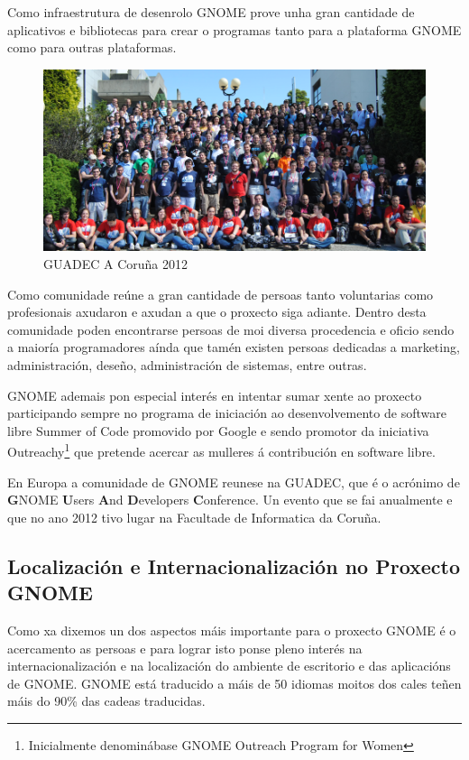 Como infraestrutura de desenrolo GNOME prove unha gran cantidade de aplicativos e bibliotecas para crear o programas tanto para a plataforma GNOME como para outras plataformas.

\begin{figure}[h!]
    \centering
    \includegraphics[width=\textwidth]{img/guadec_2012.png}
    \caption{GUADEC A Coruña 2012}
    \label{fig:guadec2012}
\end{figure}

Como comunidade reúne a gran cantidade de persoas tanto voluntarias como profesionais axudaron e axudan a que o proxecto siga adiante. Dentro desta comunidade poden encontrarse persoas de moi diversa procedencia e oficio sendo a maioría programadores aínda que tamén existen persoas dedicadas a marketing, administración, deseño, administración de sistemas, entre outras.

GNOME ademais pon especial interés en intentar sumar xente ao proxecto participando sempre no programa de iniciación ao desenvolvemento de software libre Summer of Code promovido por Google e sendo promotor da iniciativa Outreachy\footnote{Inicialmente denominábase GNOME Outreach Program for Women} que pretende acercar as mulleres á contribución en software libre.

En Europa a comunidade de GNOME reunese na GUADEC, que é o acrónimo de \textbf{G}NOME \textbf{U}sers \textbf{A}nd \textbf{D}evelopers \textbf{C}onference. Un evento que se fai anualmente e que no ano 2012 tivo lugar na Facultade de Informatica da Coruña.

\subsection{Localización e Internacionalización no Proxecto GNOME}
Como xa dixemos un dos aspectos máis importante para o proxecto GNOME é o acercamento as persoas e para lograr isto ponse pleno interés na internacionalización e na localización do ambiente de escritorio e das aplicacións de GNOME. GNOME está traducido a máis de 50 idiomas moitos dos cales teñen máis do 90\% das cadeas traducidas.

